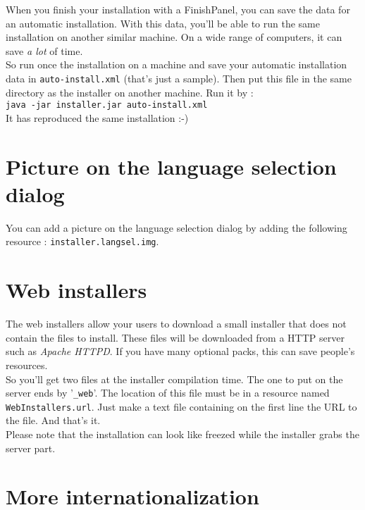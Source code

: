 When you finish your installation with a FinishPanel, you can save the data for
an automatic installation. With this data, you'll be able to run the same
installation on another similar machine. On a wide range of computers, it can
save \textsl{a lot} of time.\\

So run once the installation on a machine and save your automatic installation
data in \texttt{auto-install.xml} (that's just a sample). Then put this file in
the same directory as the installer on another machine. Run it by :\\
\texttt{java -jar installer.jar auto-install.xml}\\

It has reproduced the same installation :-)\\

\section{Picture on the language selection dialog}

You can add a picture on the language selection dialog by adding the following
resource : \texttt{installer.langsel.img}.\\

\section{Web installers}

The web installers allow your users to download a small installer that does not
contain the files to install. These files will be downloaded from a HTTP server
such as \textit{Apache HTTPD}. If you have many optional packs, this can save
people's resources.\\

So you'll get two files at the installer compilation time. The one to put on the
server ends by '\texttt{\_web}'. The location of this file must be in a resource
named \texttt{WebInstallers.url}. Just make a text file containing on the first
line the URL to the file. And that's it.\\

Please note that the installation can look like freezed while the installer
grabs the server part.\\

\section{More internationalization}

